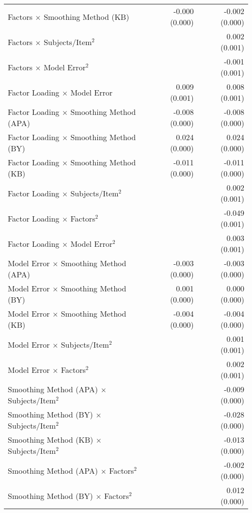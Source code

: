 \documentclass[
  english,
  man]{apa6}
\begin{document}
\begin{center}
\begin{longtable}{l D{)}{)}{11)0} D{)}{)}{11)0}}
Factors $\times$ Smoothing Method (KB)            & -0.000 \; (0.000) & -0.002 \; (0.000) \\
Factors $\times$ Subjects/Item$^2$                &                   & 0.002 \; (0.001)  \\
Factors $\times$ Model Error$^2$                  &                   & -0.001 \; (0.001) \\
Factor Loading $\times$ Model Error               & 0.009 \; (0.001)  & 0.008 \; (0.001)  \\
Factor Loading $\times$ Smoothing Method (APA)    & -0.008 \; (0.000) & -0.008 \; (0.000) \\
Factor Loading $\times$ Smoothing Method (BY)     & 0.024 \; (0.000)  & 0.024 \; (0.000)  \\
Factor Loading $\times$ Smoothing Method (KB)     & -0.011 \; (0.000) & -0.011 \; (0.000) \\
Factor Loading $\times$ Subjects/Item$^2$         &                   & 0.002 \; (0.001)  \\
Factor Loading $\times$ Factors$^2$               &                   & -0.049 \; (0.001) \\
Factor Loading $\times$ Model Error$^2$           &                   & 0.003 \; (0.001)  \\
Model Error $\times$ Smoothing Method (APA)       & -0.003 \; (0.000) & -0.003 \; (0.000) \\
Model Error $\times$ Smoothing Method (BY)        & 0.001 \; (0.000)  & 0.000 \; (0.000)  \\
Model Error $\times$ Smoothing Method (KB)        & -0.004 \; (0.000) & -0.004 \; (0.000) \\
Model Error $\times$ Subjects/Item$^2$            &                   & 0.001 \; (0.001)  \\
Model Error $\times$ Factors$^2$                  &                   & 0.002 \; (0.001)  \\
Smoothing Method (APA) $\times$ Subjects/Item$^2$ &                   & -0.009 \; (0.000) \\
Smoothing Method (BY) $\times$ Subjects/Item$^2$  &                   & -0.028 \; (0.000) \\
Smoothing Method (KB) $\times$ Subjects/Item$^2$  &                   & -0.013 \; (0.000) \\
Smoothing Method (APA) $\times$ Factors$^2$       &                   & -0.002 \; (0.000) \\
Smoothing Method (BY) $\times$ Factors$^2$        &                   & 0.012 \; (0.000)  \\

\end{longtable}
\end{center}
\end{document}
